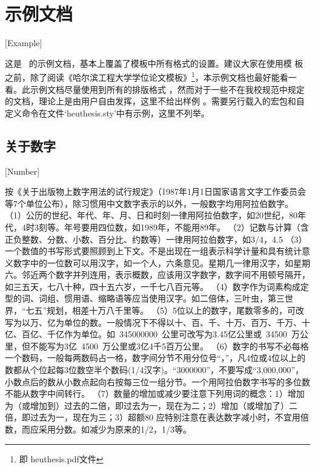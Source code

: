 
\chapter{示例文档}[Example]

这是 \heuthesis\ 的示例文档，基本上覆盖了模板中所有格式的设置。建议大家在使用模
板之前，除了阅读《\heuthesis\:哈尔滨工程大学学位论文模板》\footnote{即
  heuthesis.pdf文件}，本示例文档也最好能看一看。此示例文档尽量使用到所有的排版格式
，然而对于一些不在我校规范中规定的文档，理论上是由用户自由发挥，这里不给出样例
。需要另行载入的宏包和自定义命令在文件`heuthesis.sty'中有示例，这里不列举。

\section{关于数字}[Number]

按《关于出版物上数字用法的试行规定》（1987年1月1日国家语言文字工作委员会等7个单位公布），除习惯用中文数字表示的以外，一般数字均用阿拉伯数字。
（1）公历的世纪、年代、年、月、日和时刻一律用阿拉伯数字，如20世纪，80年代，4时3刻等。年号要用四位数，如1989年，不能用89年。
（2）记数与计算（含正负整数、分数、小数、百分比、约数等）一律用阿拉伯数字，如3/4，4.5%
（3）一个数值的书写形式要照顾到上下文。不是出现在一组表示科学计量和具有统计意义数字中的一位数可以用汉字，如一个人，六条意见。星期几一律用汉字，如星期六。邻近两个数字并列连用，表示概数，应该用汉字数字，数字间不用顿号隔开，如三五天，七八十种，四十五六岁，一千七八百元等。
（4）数字作为词素构成定型的词、词组、惯用语、缩略语等应当使用汉字。如二倍体，三叶虫，第三世界，“七五”规划，相差十万八千里等。
（5）5位以上的数字，尾数零多的，可改写为以万、亿为单位的数。一般情况下不得以十、百、千、十万、百万、千万、十亿、百亿、千亿作为单位。如~\num{345000000}~公里可改写为3.45亿公里或~\num{34500}~万公里，但不能写为3亿~\num{4500}~万公里或3亿4千5百万公里。
（6）数字的书写不必每格一个数码，一般每两数码占一格，数字间分节不用分位号“，”，凡4位或4位以上的数都从个位起每3位数空半个数码(1/4汉字)。“\num{3000000}”，不要写成“3,000,000”，小数点后的数从小数点起向右按每三位一组分节。一个用阿拉伯数字书写的多位数不能从数字中间转行。
（7）数量的增加或减少要注意下列用词的概念：1）增加为（或增加到）过去的二倍，即过去为一，现在为二；2）增加（或增加了）二倍，即过去为一，现在为三；3）超额80%
应特别注意在表达数字减小时，不宜用倍数，而应采用分数。如减少为原来的1/2，1/3等。


